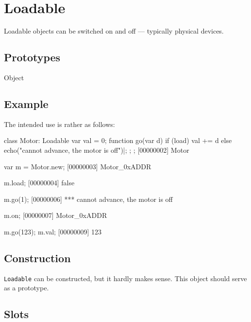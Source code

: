 \section{Loadable}

Loadable objects can be switched on and off --- typically physical
devices.

\subsection{Prototypes}

\begin{refObjects}
\item[Object]
\end{refObjects}

\subsection{Example}

The intended use is rather as follows:

\begin{urbiscript}
class Motor: Loadable
{
  var val = 0;
  function go(var d)
  {
    if (load)
      val += d
    else
      echo("cannot advance, the motor is off")|;
  };
};
[00000002] Motor

var m = Motor.new;
[00000003] Motor_0xADDR

m.load;
[00000004] false

m.go(1);
[00000006] *** cannot advance, the motor is off

m.on;
[00000007] Motor_0xADDR

m.go(123);
m.val;
[00000009] 123
\end{urbiscript}

\subsection{Construction}

\lstinline|Loadable| can be constructed, but it hardly makes sense.
This object should serve as a prototype.

\subsection{Slots}


